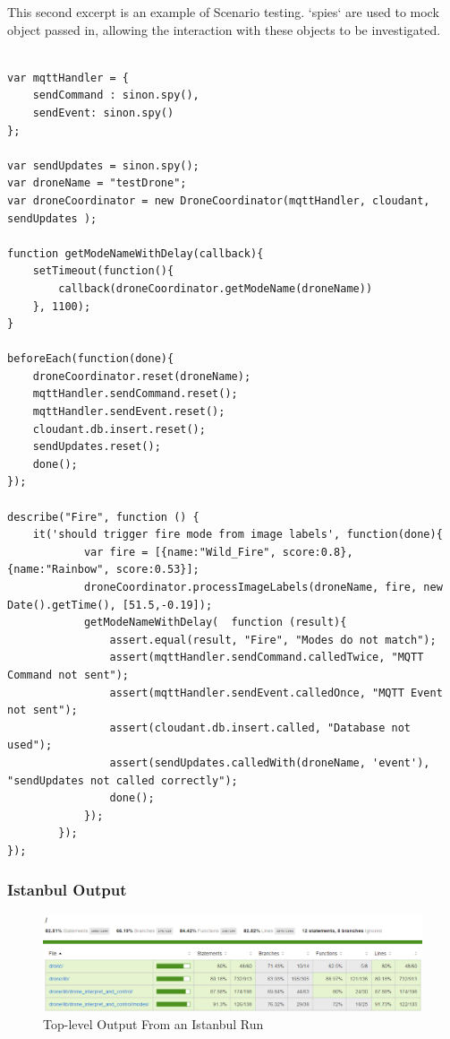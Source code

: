 \documentclass{article}
\begin{document}
This second excerpt is an example of Scenario testing. `spies` are used to mock object passed in, allowing the interaction with these objects to be investigated. 
\begin{lstlisting}[label=mocha2]

var mqttHandler = {
	sendCommand : sinon.spy(),
	sendEvent: sinon.spy()
};

var sendUpdates = sinon.spy();
var droneName = "testDrone";
var droneCoordinator = new DroneCoordinator(mqttHandler, cloudant, sendUpdates );

function getModeNameWithDelay(callback){
	setTimeout(function(){
		callback(droneCoordinator.getModeName(droneName))
	}, 1100);
}

beforeEach(function(done){
	droneCoordinator.reset(droneName);
	mqttHandler.sendCommand.reset();
	mqttHandler.sendEvent.reset();
	cloudant.db.insert.reset();
	sendUpdates.reset();
	done();
});

describe("Fire", function () {
	it('should trigger fire mode from image labels', function(done){
            var fire = [{name:"Wild_Fire", score:0.8}, {name:"Rainbow", score:0.53}];
            droneCoordinator.processImageLabels(droneName, fire, new Date().getTime(), [51.5,-0.19]);
            getModeNameWithDelay(  function (result){
                assert.equal(result, "Fire", "Modes do not match");
                assert(mqttHandler.sendCommand.calledTwice, "MQTT Command not sent");
                assert(mqttHandler.sendEvent.calledOnce, "MQTT Event not sent");
                assert(cloudant.db.insert.called, "Database not used");
                assert(sendUpdates.calledWith(droneName, 'event'), "sendUpdates not called correctly");
                done();
            });
        });
});
\end{lstlisting} 

\subsubsection{Istanbul Output}
\begin{figure}[H]
\caption{Top-level Output From an Istanbul Run\label{fig:istanbulOutput}}
\includegraphics[width=\textwidth]{Istanbul}
\end{figure}
\end{document}
